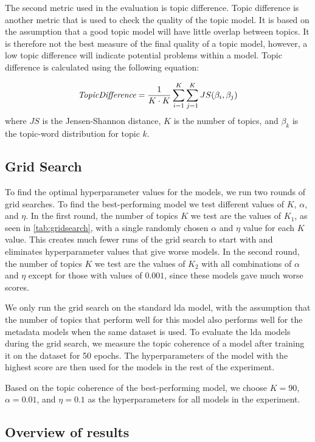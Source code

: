 The second metric used in the evaluation is topic difference.
Topic difference is another metric that is used to check the quality of the topic model.
It is based on the assumption that a good topic model will have little overlap between topics.
It is therefore not the best measure of the final quality of a topic model, however, a low topic difference will indicate potential problems within a model.
Topic difference is calculated using the following equation:

\begin{equation}
	\emph{TopicDifference} = \frac{1}{K \cdot K} \sum_{i=1}^{K} \sum_{j=1}^{K} JS(\beta_{i},\beta_{j})
\end{equation}
\noindent where $JS$ is the Jensen-Shannon distance, $K$ is the number of topics, and $\beta_{k}$ is the topic-word distribution for topic $k$.

\subsection{Grid Search}\label{sec:experiment_gridsearch}
To find the optimal hyperparameter values for the models, we run two rounds of grid searches.
To find the best-performing model we test different values of $K$, $\alpha$, and $\eta$.
In the first round, the number of topics $K$ we test are the values of $K_1$, as seen in \autoref{tab:gridsearch}, with a single randomly chosen $\alpha$ and $\eta$ value for each $K$ value.
This creates much fewer runs of the grid search to start with and eliminates hyperparameter values that give worse models.
In the second round, the number of topics $K$ we test are the values of $K_2$ with all combinations of $\alpha$ and $\eta$ except for those with values of $0.001$, since these models gave much worse scores.

We only run the grid search on the standard \gls{lda} model, with the assumption that the number of topics that perform well for this model also performs well for the metadata models when the same dataset is used.
To evaluate the \gls{lda} models during the grid search, we measure the topic coherence of a model after training it on the dataset for 50 epochs.
The hyperparameters of the model with the highest score are then used for the models in the rest of the experiment.

Based on the topic coherence of the best-performing model, we choose $K = 90$, $\alpha = 0.01$, and $\eta = 0.1$ as the hyperparameters for all models in the experiment.



\subsection{Overview of results}\label{sec:results}


